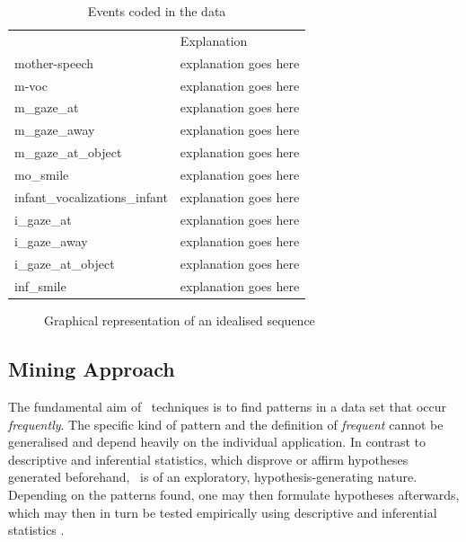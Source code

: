 \begin{table}
	\centering
	\begin{tabular}{>{\ttfamily}ll} 
		\toprule
		{\rmfamily Event}			& Explanation \\
		\cmidrule(lr){1-1} \cmidrule(lr){2-2}
		mother-speech					& explanation goes here \\
		m-voc							& explanation goes here \\
		m\_gaze\_at						& explanation goes here \\
		m\_gaze\_away					& explanation goes here \\
		m\_gaze\_at\_object				& explanation goes here \\
		mo\_smile						& explanation goes here \\
		\cmidrule(lr){1-1} \cmidrule(lr){2-2}
		infant\_vocalizations\_infant	& explanation goes here \\
		i\_gaze\_at						& explanation goes here \\
		i\_gaze\_away					& explanation goes here \\
		i\_gaze\_at\_object				& explanation goes here \\
		inf\_smile						& explanation goes here \\
		\bottomrule
	\end{tabular}
	\caption{Events coded in the data}
	\label{tab:events}
\end{table}

\begin{figure}
	\centering
	
	\caption{Graphical representation of an idealised sequence}
	\label{fig:idealseq}
\end{figure}

\subsection{Mining Approach}
\label{sec:mining}
The fundamental aim of \fpmlower\ techniques is to find patterns in a data set that occur \emph{frequently}. The specific kind of pattern and the definition of \emph{frequent} cannot be generalised and depend heavily on the individual application. In contrast to descriptive and inferential statistics, which disprove or affirm hypotheses generated beforehand, \fpmlower\ is of an exploratory, hypothesis-generating nature. Depending on the patterns found, one may then formulate hypotheses afterwards, which may then in turn be tested empirically using descriptive and inferential statistics \cite[]{rohlfing18,han12}.%

